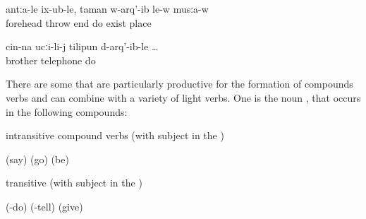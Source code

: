 \begin{exe}
	\ex	\label{ex:(They) shot him into the forehead}
	\gll	antːa-le	ix-ub-le,	taman	w-arq'-ib	le-w	musːa-w\\
		forehead	throw	end	do	exist	place\\
	\glt	{}

	\ex	\label{ex:when (they) called the brother on the phone}
	\gll	cin-na	ucːi-li-j	tilipun	d-arq'-ib-le	\ldots\\
			brother	telephone	do\\
	\glt	{}
\end{exe}

There are some  that are particularly productive for the formation of compounds verbs and can combine with a variety of light verbs. One is the noun  , that occurs in the following compounds:\largerpage

\begin{exe}
	\ex	intransitive compound verbs (with subject in the )	\label{ex:wordcompoundsintransitive}
	\begin{xlist}
		\ex	{}  (say)  
		\ex	{}  (go)  
		\ex	{}  (be)  
	\end{xlist}

	\ex	transitive (with subject in the )	\label{ex:wordcompoundstransitive}
	\begin{xlist}
		\ex	{}  (-do) \sqt{say, tell} 
		\ex	{}  (-tell) \sqt{say, tell} 
		\ex	{}  (give) \sqt{promise}
	\end{xlist}
\end{exe}

